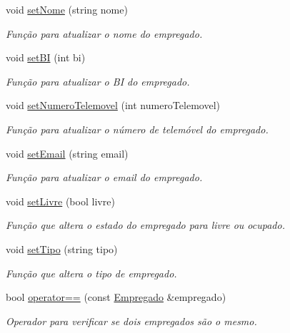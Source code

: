 \begin{DoxyCompactItemize}
void \hyperlink{class_empregado_aec2ea90adfb8b82f3e63368651d7eae3}{set\+Nome} (string nome)
\begin{DoxyCompactList}\small\item\em Função para atualizar o nome do empregado. \end{DoxyCompactList}\item 
void \hyperlink{class_empregado_ad3981e81e67c5adeba56a5cd32927a62}{set\+BI} (int bi)
\begin{DoxyCompactList}\small\item\em Função para atualizar o BI do empregado. \end{DoxyCompactList}\item 
void \hyperlink{class_empregado_a8433d00d7e57ee30847e9d4b7b63a73b}{set\+Numero\+Telemovel} (int numero\+Telemovel)
\begin{DoxyCompactList}\small\item\em Função para atualizar o número de telemóvel do empregado. \end{DoxyCompactList}\item 
void \hyperlink{class_empregado_ac158667fd5a237648c3aeeec5808f6e7}{set\+Email} (string email)
\begin{DoxyCompactList}\small\item\em Função para atualizar o email do empregado. \end{DoxyCompactList}\item 
void \hyperlink{class_empregado_a81997099011c547e71bc52c5e69532d9}{set\+Livre} (bool livre)
\begin{DoxyCompactList}\small\item\em Função que altera o estado do empregado para livre ou ocupado. \end{DoxyCompactList}\item 
void \hyperlink{class_empregado_ac98a214b87035b73252cfb96fe2866bd}{set\+Tipo} (string tipo)
\begin{DoxyCompactList}\small\item\em Função que altera o tipo de empregado. \end{DoxyCompactList}\item 
bool \hyperlink{class_empregado_a853fad9194cfb37648003e7b4acd431c}{operator==} (const \hyperlink{class_empregado}{Empregado} \&empregado)
\begin{DoxyCompactList}\small\item\em Operador para verificar se dois empregados são o mesmo. \end{DoxyCompactList}\end{DoxyCompactItemize}


